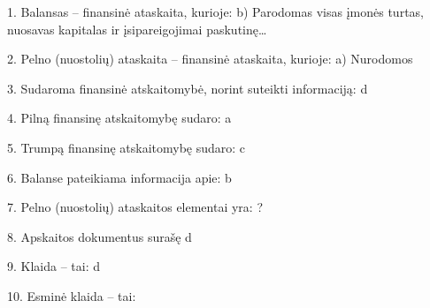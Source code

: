 1. Balansas – finansinė ataskaita, kurioje:
b) Parodomas visas įmonės turtas, nuosavas kapitalas ir
įsipareigojimai paskutinę…

2. Pelno (nuostolių) ataskaita – finansinė ataskaita, kurioje:
a) Nurodomos

3. Sudaroma finansinė atskaitomybė, norint suteikti informaciją:
d

4. Pilną finansinę atskaitomybę sudaro:
a

5. Trumpą finansinę atskaitomybę sudaro:
c

6. Balanse pateikiama informacija apie:
b

7. Pelno (nuostolių) ataskaitos elementai yra:
?

8. Apskaitos dokumentus surašę
d

9. Klaida – tai:
d

10. Esminė klaida – tai:
